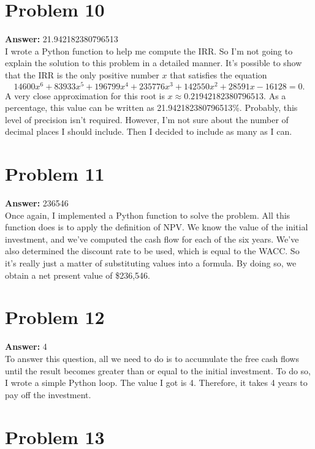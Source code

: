 \documentclass[11pt]{article}
\begin{document}
\section*{Problem 10}
\label{sec:org08079b0}

\textbf{Answer:} 21.942182380796513\\

I wrote a Python function to help me compute the IRR. So I'm not going to
explain the solution to this problem in a detailed manner. It's possible to show
that the IRR is the only positive number \(x\) that satisfies the equation
\begin{equation}
14600 x^6 + 83933 x^5 + 196799 x^4 + 235776 x^3 + 142550 x^2 + 28591 x - 16128 = 0.
\end{equation}
A very close approximation for this root is \(x\approx 0.21942182380796513\).
As a percentage, this value can be written as 21.942182380796513\%. Probably,
this level of precision isn't required. However, I'm not sure about the number
of decimal places I should include. Then I decided to include as many as I can.
\section*{Problem 11}
\label{sec:org52bd0ef}

\textbf{Answer:} 236546\\

Once again, I implemented a Python function to solve the problem. All this
function does is to apply the definition of NPV. We know the value of the
initial investment, and we've computed the cash flow for each of the six years.
We've also determined the discount rate to be used, which is equal to the WACC.
So it's really just a matter of substituting values into a formula. By doing so,
we obtain a net present value of \$236,546.
\section*{Problem 12}
\label{sec:org0344482}

\textbf{Answer:} 4\\

To answer this question, all we need to do is to accumulate the free cash flows
until the result becomes greater than or equal to the initial investment. To do
so, I wrote a simple Python loop. The value I got is 4. Therefore, it takes 4
years to pay off the investment.
\section*{Problem 13}
\label{sec:org7a364cc}
\end{document}

